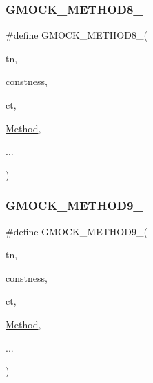 \mbox{\label{_obj__test_2lib_2googletest-release-1_88_81_2googlemock_2include_2gmock_2gmock-generated-function-mockers_8h_aa84a36427c44505207b7cad5dec7ad67}} 
\subsubsection{\texorpdfstring{GMOCK\_METHOD8\_}{GMOCK\_METHOD8\_}}
{\footnotesize\ttfamily \#define G\+M\+O\+C\+K\+\_\+\+M\+E\+T\+H\+O\+D8\+\_\+(\begin{DoxyParamCaption}\item[{}]{tn,  }\item[{}]{constness,  }\item[{}]{ct,  }\item[{}]{\mbox{\hyperlink{_obj__test_2lib_2googletest-release-1_88_81_2googlemock_2test_2gmock-spec-builders__test_8cc_a95606368148f3e5aab5db46c32466afd}{Method}},  }\item[{}]{... }\end{DoxyParamCaption})}

\mbox{\label{_obj__test_2lib_2googletest-release-1_88_81_2googlemock_2include_2gmock_2gmock-generated-function-mockers_8h_aa820171a19cc587c247dbe05cbffc55f}} 
\subsubsection{\texorpdfstring{GMOCK\_METHOD9\_}{GMOCK\_METHOD9\_}}
{\footnotesize\ttfamily \#define G\+M\+O\+C\+K\+\_\+\+M\+E\+T\+H\+O\+D9\+\_\+(\begin{DoxyParamCaption}\item[{}]{tn,  }\item[{}]{constness,  }\item[{}]{ct,  }\item[{}]{\mbox{\hyperlink{_obj__test_2lib_2googletest-release-1_88_81_2googlemock_2test_2gmock-spec-builders__test_8cc_a95606368148f3e5aab5db46c32466afd}{Method}},  }\item[{}]{... }\end{DoxyParamCaption})}

